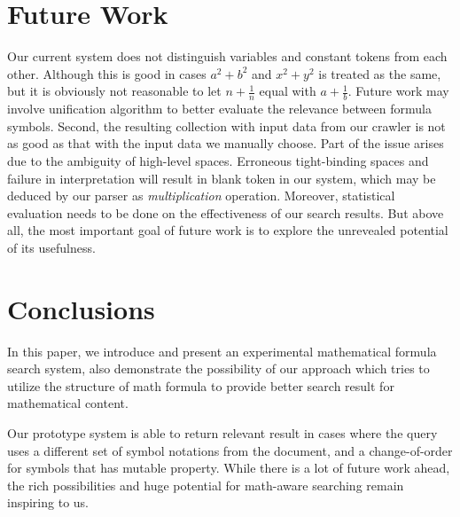 \documentclass{acm_proc_article-sp}
\begin{document}
\section{Future Work}
Our current system does not distinguish variables and constant tokens from each other. Although this is good in cases $a^2 + b^2$ and $x^2 + y^2$ is treated as the same, but it is obviously not reasonable to let $n+\frac{1}{n}$ equal with $a+\frac{1}{b}$. Future work may involve unification algorithm\cite{Baader} to better evaluate the relevance between formula symbols. Second, the resulting collection with input data from our crawler is not as good as that with the input data we manually choose. Part of the issue arises due to the ambiguity of high-level spaces\cite{Richard}. Erroneous tight-binding spaces and failure in interpretation will result in blank token in our system, which may be deduced by our parser as \textit{multiplication} operation. Moreover, statistical evaluation needs to be done on the effectiveness of our search results. But above all, the most important goal of future work is to explore the unrevealed potential of its usefulness.

\section{Conclusions}
In this paper, we introduce and present an experimental mathematical formula search system, also demonstrate the possibility of our approach which tries to utilize the structure of math formula to provide better search result for mathematical content. 

Our prototype system is able to return relevant result in cases where the query uses a different set of symbol notations from the document, and a change-of-order for symbols that has mutable property. While there is a lot of future work ahead, the rich possibilities and huge potential for math-aware searching remain inspiring to us.


\end{document}
